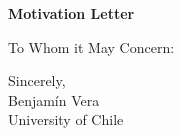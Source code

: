 \documentclass{letter}
\date{}
\begin{document}
\begin{letter}
	{
		\centering \Large \textbf{Motivation Letter}
	}

	\opening{To Whom it May Concern:}
	\medskip

	\lipsum[1-2]

	\medskip
	Sincerely, \\
	Benjamín Vera \\
	University of Chile

\end{letter}
\end{document}
